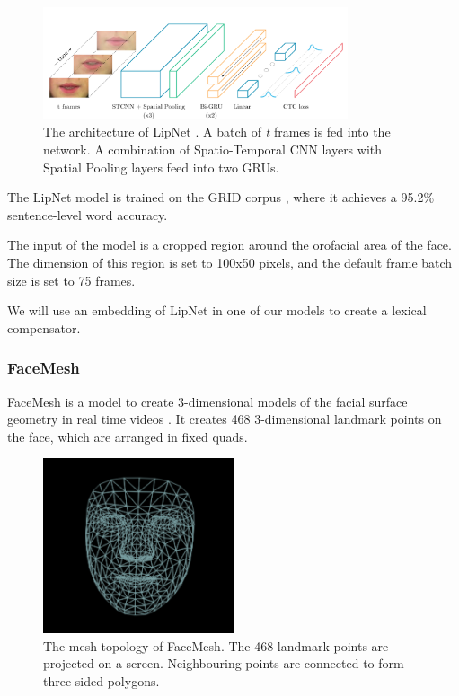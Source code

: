 \begin{figure}
    \centering
    \includegraphics[width=0.8\textwidth]{res/lipnet.png}
    \caption{The architecture of LipNet \cite{assael2016lipnet}. A batch of \textit{t} frames is fed into the network. A combination of Spatio-Temporal CNN layers with Spatial Pooling layers feed into two GRUs.}
    \label{fig:lipnet}
\end{figure}

The LipNet model is trained on the GRID corpus \cite{cooke2006grid}, where it achieves a 95.2\% sentence-level word accuracy.

The input of the model is a cropped region around the orofacial area of the face. The dimension of this region is set to 100x50 pixels, and the default frame batch size is set to 75 frames.

We will use an embedding of LipNet in one of our models to create a lexical compensator.

\subsubsection{FaceMesh}


FaceMesh is a model to create 3-dimensional models of the facial surface geometry in real time videos \cite{kartynnik2019facemesh}. It creates 468 3-dimensional landmark points on the face, which are arranged in fixed quads.

\begin{figure}
    \centering
    \includegraphics[width=0.5\textwidth]{res/facemesh2.png}
    \caption{The mesh topology of FaceMesh. The 468 landmark points are projected on a screen. Neighbouring points are connected to form three-sided polygons.}
    \label{fig:facemesh}
\end{figure}


